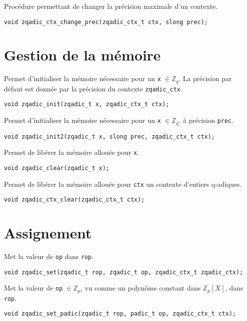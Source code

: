 \documentclass[11pt]{article}
\begin{document}
Procédure permettant de changer la précision maximale d'un contexte.
\begin{verbatim}
void zqadic_ctx_change_prec(zqadic_ctx_t ctx, slong prec);
\end{verbatim}


\section{Gestion de la mémoire}

Permet d'initialiser la mémoire nécessaire pour un \texttt{x} $\in \mathbb{Z}_q$. La précision par défaut est donnée par la précision du contexte \texttt{zqadic_ctx}.
\begin{verbatim}
void zqadic_init(zqadic_t x, zqadic_ctx_t ctx);
\end{verbatim}

Permet d'initialiser la mémoire nécessaire pour un \texttt{x} $\in \mathbb{Z}_q$, à précision \texttt{prec}.
\begin{verbatim}
void zqadic_init2(zqadic_t x, slong prec, zqadic_ctx_t ctx);
\end{verbatim}

Permet de libérer la mémoire allouée pour \texttt{x}.
\begin{verbatim}
void zqadic_clear(zqadic_t x);
\end{verbatim}

Permet de libérer la mémoire allouée pour \texttt{ctx} un contexte d'entiers q-adiques.
\begin{verbatim}
void zqadic_ctx_clear(zqadic_ctx_t ctx);
\end{verbatim}


\section{Assignement}

Met la valeur de \texttt{op} dans \texttt{rop}.
\begin{verbatim}
void zqadic_set(zqadic_t rop, zqadic_t op, zqadic_ctx_t zqadic_ctx);
\end{verbatim}

Met la valeur de \texttt{op} $\in \mathbb{Z}_p$, vu comme un polynôme constant dans $\mathbb{Z}_p[X]$, dans \texttt{rop}.
\begin{verbatim}
void zqadic_set_padic(zqadic_t rop, padic_t op, zqadic_ctx_t ctx);
\end{verbatim}
\end{document}
